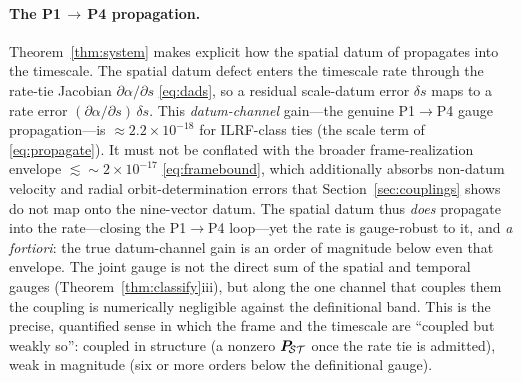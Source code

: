 \paragraph{The P1\,$\to$\,P4 propagation.}
Theorem~\ref{thm:system} makes explicit how the spatial datum of \citep{baweja2026datum}
propagates into the timescale. The spatial datum defect enters the timescale rate through
the rate-tie Jacobian $\partial\alpha/\partial s$ \eqref{eq:dads}, so a residual scale-datum
error $\delta s$ maps to a rate error $(\partial\alpha/\partial s)\,\delta s$. This
\emph{datum-channel} gain---the genuine P1$\to$P4 gauge propagation---is
$\approx2.2\times10^{-18}$ for ILRF-class ties (the scale term of \eqref{eq:propagate}). It
must not be conflated with the broader frame-realization envelope
$\lesssim\!\sim\!2\times10^{-17}$ \eqref{eq:framebound}, which additionally absorbs non-datum
velocity and radial orbit-determination errors that Section~\ref{sec:couplings} shows do not
map onto the nine-vector datum. The spatial datum thus \emph{does} propagate into the
rate---closing the P1$\to$P4 loop---yet the rate is gauge-robust to it, and \emph{a
fortiori}: the true datum-channel gain is an order of magnitude below even that envelope. The
joint gauge is not the direct sum of the spatial and temporal gauges
(Theorem~\ref{thm:classify}iii), but along the one channel that couples them the coupling is
numerically negligible against the definitional band. This is the precise, quantified sense
in which the frame and the timescale are ``coupled but weakly so'': coupled in structure
(a nonzero $\bm{P}_{\!\mathcal{S}\mathcal{T}}$ once the rate tie is admitted), weak in magnitude (six or more orders below
the definitional gauge).
